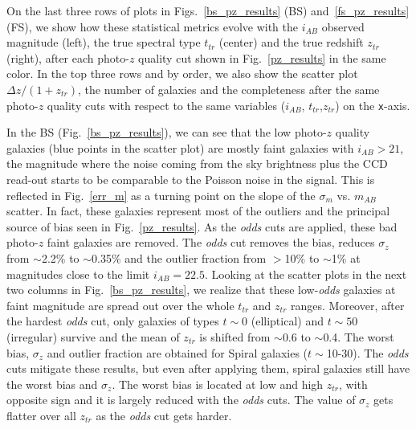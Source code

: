 On the last three rows of plots in Figs.~\ref{bs_pz_results} (BS) and~\ref{fs_pz_results} (FS), we show how these statistical metrics evolve with the $i_{AB}$ observed magnitude (left), the true spectral type $t_{tr}$ (center) and the true redshift $z_{tr}$ (right), after each photo-$z$ quality cut shown in Fig.~\ref{pz_results} in the same color. In the top three rows and by order, we also show the scatter plot $\Delta z / (1+z_{tr})$, the number of galaxies and the completeness after the same photo-$z$ quality cuts with respect to the same variables ($i_{AB}$, $t_{tr}$,$z_{tr}$) on the \texttt{x}-axis.

In the BS (Fig.~\ref{bs_pz_results}), we can see that the low photo-$z$ quality galaxies (blue points in the scatter plot) are mostly faint galaxies with $i_{AB}>21$, the magnitude where the noise coming from the sky brightness plus the CCD read-out starts to be comparable to the Poisson noise in the signal. This is reflected in Fig.~\ref{err_m} as a turning point on the slope of the $\sigma_m$ vs. $m_{AB}$ scatter. In fact, these galaxies represent most of the outliers and the principal source of bias seen in Fig.~\ref{pz_results}. As the \textit{odds} cuts are applied, these bad photo-$z$ faint galaxies are removed. The \textit{odds} cut removes the bias, reduces $\sigma_z$ from $\sim$2.2\% to $\sim$0.35\% and the outlier fraction from $>$10\% to $\sim$1\% at magnitudes close to the limit $i_{AB}=22.5$. Looking at the scatter plots in the next two columns in Fig.~\ref{bs_pz_results}, we realize that these low-\textit{odds} galaxies at faint magnitude are spread out over the whole $t_{tr}$ and $z_{tr}$ ranges. Moreover, after the hardest \textit{odds} cut, only galaxies of types $t\sim0$ (elliptical) and $t\sim50$ (irregular) survive and the mean of $z_{tr}$ is shifted from $\sim$0.6 to $\sim$0.4. The worst bias, $\sigma_z$ and outlier fraction are obtained for Spiral galaxies ($t\sim$10-30). The \textit{odds} cuts mitigate these results, but even after applying them, spiral galaxies still have the worst bias and $\sigma_z$. The worst bias is located at low and high $z_{tr}$, with opposite sign and it is largely reduced with the \textit{odds} cuts. The value of $\sigma_z$ gets flatter over all $z_{tr}$ as the \textit{odds} cut gets harder.

